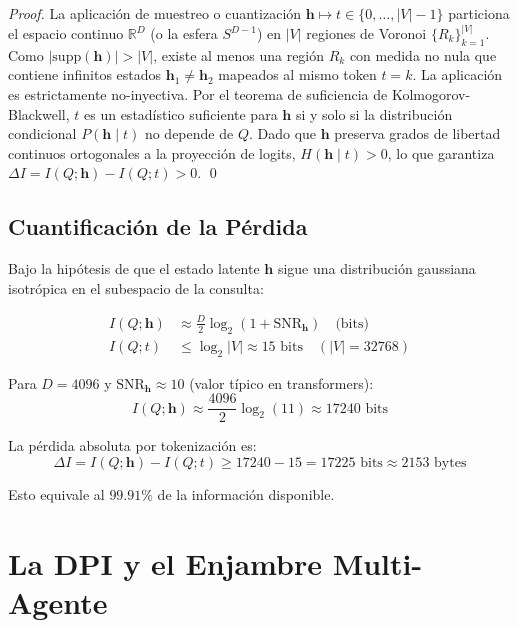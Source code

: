 \begin{proof}
La aplicación de muestreo o cuantización $\mathbf{h} \mapsto t \in \{0, \dots, |V|-1\}$ 
particiona el espacio continuo $\mathbb{R}^D$ (o la esfera $S^{D-1}$) en $|V|$ regiones de Voronoi 
$\{R_k\}_{k=1}^{|V|}$. Como $|\text{supp}(\mathbf{h})| > |V|$, existe al menos una región $R_k$ 
con medida no nula que contiene infinitos estados $\mathbf{h}_1 \neq \mathbf{h}_2$ mapeados al 
mismo token $t = k$. La aplicación es estrictamente no-inyectiva. Por el teorema de suficiencia 
de Kolmogorov-Blackwell, $t$ es un estadístico suficiente para $\mathbf{h}$ si y solo si la 
distribución condicional $P(\mathbf{h} \mid t)$ no depende de $Q$. Dado que $\mathbf{h}$ preserva 
grados de libertad continuos ortogonales a la proyección de logits, $H(\mathbf{h} \mid t) > 0$, 
lo que garantiza $\Delta I = I(Q; \mathbf{h}) - I(Q; t) > 0$. \qed
\end{proof}

\subsection{Cuantificación de la Pérdida}

Bajo la hipótesis de que el estado latente $\mathbf{h}$ sigue una distribución
gaussiana isotrópica en el subespacio de la consulta:

\begin{align}
I(Q; \mathbf{h}) &\approx \frac{D}{2} \log_2\left(1 + \text{SNR}_{\mathbf{h}}\right) \quad \text{(bits)} \\
I(Q; t) &\le \log_2 |V| \approx 15 \text{ bits} \quad (|V| = 32768)
\end{align}

Para $D = 4096$ y $\text{SNR}_{\mathbf{h}} \approx 10$ (valor típico en transformers):
\begin{equation}
I(Q; \mathbf{h}) \approx \frac{4096}{2} \log_2(11) \approx 17240 \text{ bits}
\end{equation}

La pérdida absoluta por tokenización es:
\begin{equation}
\Delta I = I(Q; \mathbf{h}) - I(Q; t) \ge 17240 - 15 = 17225 \text{ bits} \approx 2153 \text{ bytes}
\end{equation}

Esto equivale al $99.91\%$ de la información disponible.

\section{La DPI y el Enjambre Multi-Agente}

